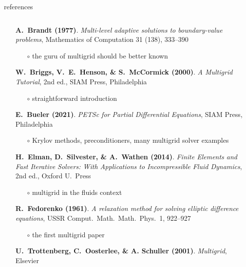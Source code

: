 \documentclass[10pt,
               svgnames,
               hyperref={colorlinks,citecolor=DeepPink4,linkcolor=FireBrick,urlcolor=Maroon},
               usepdftitle=false]{beamer}
\begin{document}
\begin{frame}{references}


\begin{columns}
\begin{column}{0.8\textwidth}
\begin{itemize}
\item[] \textbf{A.~Brandt (1977)}. \emph{Multi-level adaptive solutions to boundary-value problems}, Mathematics of Computation 31 (138), 333--390
    \begin{itemize}
    \item[$\circ$] the guru of multigrid should be better known
    \end{itemize}
\item[] \textbf{W.~Briggs, V.~E.~Henson, \& S.~McCormick (2000)}.  \emph{A Multigrid Tutorial}, 2nd ed., SIAM Press, Philadelphia
    \begin{itemize}
    \item[$\circ$] straightforward introduction
    \end{itemize}
\item[] \textbf{E.~Bueler (2021)}. \emph{PETSc for Partial Differential Equations}, SIAM Press, Philadelphia
    \begin{itemize}
    \item[$\circ$] Krylov methods, preconditioners, many multigrid solver examples
    \end{itemize}
\item[] \textbf{H.~Elman, D.~Silvester, \& A.~Wathen (2014)}. \emph{Finite Elements and Fast Iterative Solvers: With Applications to Incompressible Fluid Dynamics}, 2nd ed., Oxford U.~Press
    \begin{itemize}
    \item[$\circ$] multigrid in the fluids context
    \end{itemize}
\item[] \textbf{R.~Fedorenko (1961)}.  \emph{A relaxation method for solving elliptic difference equations}, USSR Comput.~Math.~Math.~Phys.~1, 922--927
    \begin{itemize}
    \item[$\circ$] the first multigrid paper
    \end{itemize}
\item[] \textbf{U.~Trottenberg, C.~Oosterlee, \& A. Schuller (2001)}.  \emph{Multigrid}, Elsevier

\end{itemize}
\end{column}
\end{columns}
\end{frame}
\end{document}
